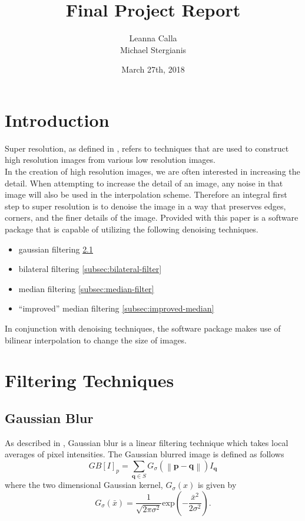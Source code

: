 \documentclass{article}
\title{Final Project Report}
\author{Leanna Calla \\ Michael Stergianis}
\date{March 27th, 2018}
\newcommand{\norm}[1]{\left\| #1 \right\|}
\begin{document}
\maketitle
%
%
\section{Introduction}
\label{sec:introduction}
Super resolution, as defined in \cite{Yang}, refers to techniques that
are used to construct high resolution images from various low
resolution images. \\

In the creation of high resolution images, we are often interested in
increasing the detail. When attempting to increase the detail of an image, any noise in
that image will also be used in the interpolation scheme. Therefore
an integral first step to super resolution is to denoise the image
in a way that preserves edges, corners, and the finer details of the
image.
%
Provided with this paper is a software package that is capable of
utilizing the following denoising techniques.
\begin{itemize}
  \item gaussian filtering \ref{subsec:gauss-blur}
  \item bilateral filtering \ref{subsec:bilateral-filter}
  \item median filtering \ref{subsec:median-filter}
  \item ``improved'' median filtering \ref{subsec:improved-median}
\end{itemize}
%
In conjunction with denoising techniques, the software package makes
use of bilinear interpolation to change the size of images.
%
\section{Filtering Techniques}
\label{sec:filter-tech}
\subsection{Gaussian Blur}
\label{subsec:gauss-blur}
As described in \cite{bilateral}, Gaussian blur is a linear filtering
technique which takes local averages of pixel intensities. The
Gaussian blurred image is defined as follows
\[GB[I]_p = \displaystyle \sum_{\textbf{q} \in S}G_{\sigma} \left(
    \norm{\textbf{p} - \textbf{q}}\right)I_{\textbf{q}} \]
where the two dimensional Gaussian kernel, $G_{\sigma}(x)$ is given by
\[G_{\sigma}(\bar{x}) = \frac{1}{\sqrt{2 \pi \sigma^2}} \text{exp} \left(-
    \frac{\bar{x}^2}{2 \sigma^2}\right). \]
%
\end{document}
